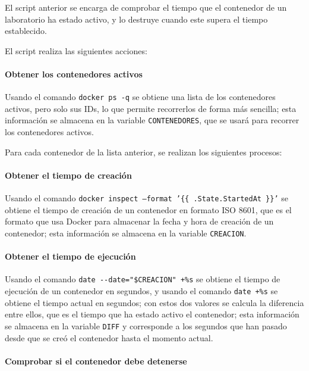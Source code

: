             El script anterior se encarga de comprobar el tiempo que el contenedor de un laboratorio ha estado activo, y lo destruye cuando este supera el tiempo establecido.
        
            El script realiza las siguientes acciones:

            \paragraph{Obtener los contenedores activos}
            
                Usando el comando \texttt{docker ps -q} se obtiene una lista de los contenedores activos, pero solo sus IDs, lo que permite recorrerlos de forma más sencilla; esta información se almacena en la variable \texttt{CONTENEDORES}, que se usará para recorrer los contenedores activos.

            Para cada contenedor de la lista anterior, se realizan los siguientes procesos:

            \paragraph{Obtener el tiempo de creación}
            
                Usando el comando \texttt{docker inspect --format '\{\{ .State.StartedAt \}\}'} se obtiene el tiempo de creación de un contenedor en formato ISO 8601, que es el formato que usa Docker para almacenar la fecha y hora de creación de un contenedor; esta información se almacena en la variable \texttt{CREACION}.

            \paragraph{Obtener el tiempo de ejecución}
            
                Usando el comando \verb|date --date="$CREACION" +%s| se obtiene el tiempo de ejecución de un contenedor en segundos, y usando el comando \verb|date +%s| se obtiene el tiempo actual en segundos; con estos dos valores se calcula la diferencia entre ellos, que es el tiempo que ha estado activo el contenedor; esta información se almacena en la variable \texttt{DIFF} y corresponde a los segundos que han pasado desde que se creó el contenedor hasta el momento actual.

            \paragraph{Comprobar si el contenedor debe detenerse}

